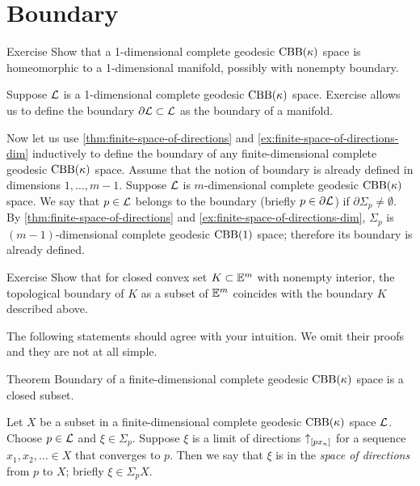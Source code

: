 \section{Boundary}

{\sloppy

\begin{thm}{Exercise}
Show that a 1-dimensional complete geodesic $\mathrm{CBB}(\kappa)$ space is homeomorphic to a 1-dimensional manifold, possibly with nonempty boundary.
\end{thm}

}

Suppose $\mathcal{L}$ is a 1-dimensional complete geodesic $\mathrm{CBB}(\kappa)$ space.
Exercise allows us to define the boundary $\partial\mathcal{L}\subset \mathcal{L}$ as the boundary of a manifold.

Now let us use \ref{thm:finite-space-of-directions} and \ref{ex:finite-space-of-directions-dim} inductively to define the boundary of any finite-dimensional complete geodesic $\mathrm{CBB}(\kappa)$ space.
Assume that the notion of boundary is already defined in dimensions $1,\dots,m-1$.
Suppose  $\mathcal{L}$ is $m$-dimensional complete geodesic $\mathrm{CBB}(\kappa)$ space.
We say that $p\in \mathcal{L}$ belongs to the boundary (briefly $p\in \partial \mathcal{L}$) if 
$\partial\Sigma_p\ne\emptyset$.
By \ref{thm:finite-space-of-directions} and \ref{ex:finite-space-of-directions-dim}, $\Sigma_p$ is $(m-1)$-dimensional complete geodesic $\mathrm{CBB}(1)$ space;
therefore its boundary is already defined.



\begin{thm}{Exercise}
Show that for closed convex set $K\subset \mathbb{E}^m$ with nonempty interior, the topological boundary of $K$ as a subset of $\mathbb{E}^m$ coincides with the boundary $K$ described above.
\end{thm}


The following statements should agree with your intuition.
We omit their proofs and they are not at all simple.

\begin{thm}{Theorem}
Boundary of a finite-dimensional complete geodesic $\mathrm{CBB}(\kappa)$ space is a closed subset.
\end{thm}

Let $X$ be a subset in a finite-dimensional complete geodesic $\mathrm{CBB}(\kappa)$ space $\mathcal{L}$.
Choose $p\in \mathcal{L}$ and $\xi\in \Sigma_p$.
Suppose $\xi$ is a limit of directions ${\uparrow}_{[{p}{x_n}]}$ for a sequence $x_1,x_2,\dots{}\in X$ that converges to $p$.
Then we say that $\xi$ is in the \emph{space of directions} from $p$ to $X$; briefly $\xi\in\Sigma_pX$.

